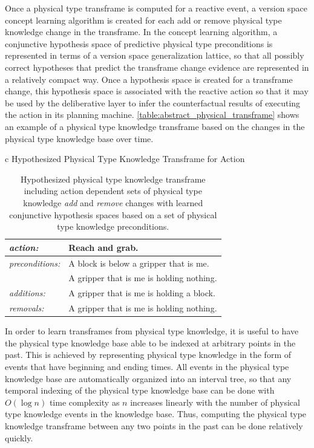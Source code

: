 Once a physical type transframe is computed for a reactive event, a
version space concept learning algorithm \cite[]{mitchell:1997} is
created for each add or remove physical type knowledge change in the
transframe.  In the concept learning algorithm, a conjunctive
hypothesis space of predictive physical type preconditions is
represented in terms of a version space generalization lattice, so
that all possibly correct hypotheses that predict the transframe
change evidence are represented in a relatively compact way.  Once a
hypothesis space is created for a transframe change, this hypothesis
space is associated with the reactive action so that it may be used by
the deliberative layer to infer the counterfactual results of
executing the action in its planning machine.
{\mbox{\autoref{table:abstract_physical_transframe}}} shows an example
of a physical type knowledge transframe based on the changes in the
physical type knowledge base over time.
\begin{table}[h]
\centering
\begin{tabular}{c}
  Hypothesized Physical Type Knowledge Transframe for Action \\
  \begin{tabular}{|l|l|}
    \hline
    \emph{action:}        & Reach and grab. \\
    \hline
    \emph{preconditions:} & A block is below a gripper that is me. \\
    ~                     & A gripper that is me is holding nothing. \\
    \hline
    \emph{additions:}     & A gripper that is me is holding a block. \\
    \hline
    \emph{removals:}      & A gripper that is me is holding nothing. \\
    \hline
  \end{tabular}
\end{tabular}
\caption[Hypothesized physical type knowledge transframe for
  action.]{Hypothesized physical type knowledge transframe including
  action dependent sets of physical type knowledge \emph{add} and
  \emph{remove} changes with learned conjunctive hypothesis spaces
  based on a set of physical type knowledge preconditions.}
\label{table:abstract_physical_transframe}
\end{table}

In order to learn transframes from physical type knowledge, it is
useful to have the physical type knowledge base able to be indexed at
arbitrary points in the past.  This is achieved by representing
physical type knowledge in the form of events that have beginning and
ending times.  All events in the physical type knowledge base are
automatically organized into an interval tree, so that any temporal
indexing of the physical type knowledge base can be done with $O(\log
n)$ time complexity as $n$ increases linearly with the number of
physical type knowledge events in the knowledge base.  Thus, computing
the physical type knowledge transframe between any two points in the
past can be done relatively quickly.


